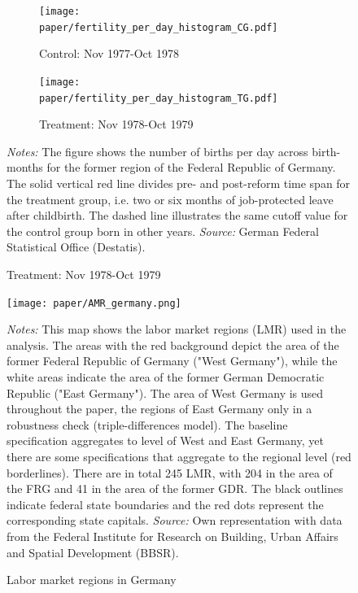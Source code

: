 \documentclass[11pt, a4paper]{article} %
\begin{document}
\begin{landscape}
	\vspace*{\fill}
	\begin{figure}
		[H]\centering
		\caption{Fertility distribution for different years}\label{fig: fertility_hist}
		\begin{subfigure}[h]{0.40\linewidth}\centering
			\caption{Control: Nov 1977-Oct 1978}
			\texttt{[image: paper/fertility\_per\_day\_histogram\_CG.pdf]}
		\end{subfigure}
		\begin{subfigure}[h]{0.40\linewidth}\centering
			\caption{Treatment: Nov 1978-Oct 1979}
			\texttt{[image: paper/fertility\_per\_day\_histogram\_TG.pdf]}
		\end{subfigure}
		\scriptsize
		\begin{minipage}{0.95\linewidth}
			\emph{Notes:} The figure shows the number of births per day across birth-months for the former region of the Federal Republic of Germany. The solid vertical red line divides pre- and post-reform time span for the treatment group, i.e. two or six months of job-protected leave after childbirth. The dashed line illustrates the same cutoff value for the control group born in other years.\newline
			\emph{Source:} German Federal Statistical Office (Destatis).
		\end{minipage}
	\end{figure}
	\vspace*{\fill}\clearpage
\end{landscape}
\vspace*{\fill}
\begin{figure}[H]\centering
	\caption{Labor market regions in Germany}\label{fig: AMR_regions_Germany}
	\texttt{[image: paper/AMR\_germany.png]}
	\scriptsize
	\begin{minipage}{0.9 \linewidth}
		\emph{Notes:} This map shows the labor market regions (LMR) used in the analysis. The areas with the red background depict the area of the former Federal Republic of Germany ("West Germany"), while the white areas indicate the area of the former German Democratic Republic ("East Germany"). The area of West Germany is used throughout the paper, the regions of East Germany only in a robustness check (triple-differences model). The baseline specification aggregates to level of West and East Germany, yet there are some specifications that aggregate to the regional level (red borderlines). There are in total 245 LMR, with 204 in the area of the FRG and 41 in the area of the former GDR. The black outlines indicate federal state boundaries and the red dots represent the corresponding state capitals. \newline \emph{Source:} Own representation with data from the Federal Institute for Research on Building, Urban Affairs and Spatial Development (BBSR).
	\end{minipage}
\end{figure}
\vspace*{\fill}\clearpage
\newpage
\end{document}
